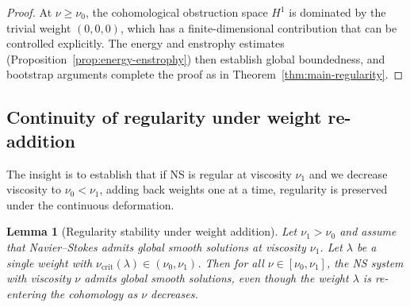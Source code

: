\documentclass[reqno,10pt]{amsart}
\theoremstyle{plain}
\newtheorem{lemma}[theorem]{Lemma}
\theoremstyle{definition}
\begin{document}
\begin{proof}
At $\nu \geq \nu_0$, the cohomological obstruction space $H^1$ is dominated by the trivial weight $(0,0,0)$, which has a finite-dimensional contribution that can be controlled explicitly. The energy and enstrophy estimates (Proposition~\ref{prop:energy-enstrophy}) then establish global boundedness, and bootstrap arguments complete the proof as in Theorem~\ref{thm:main-regularity}.
\end{proof}

\subsection{Continuity of regularity under weight re-addition}

The insight is to establish that if NS is regular at viscosity $\nu_1$ and we decrease viscosity to $\nu_0 < \nu_1$, adding back weights one at a time, regularity is preserved under the continuous deformation.

\begin{lemma}[Regularity stability under weight addition]\label{lem:weight-stability}
Let $\nu_1 > \nu_0$ and assume that Navier--Stokes admits global smooth solutions at viscosity $\nu_1$. Let $\lambda$ be a single weight with $\nu_{\text{crit}}(\lambda) \in (\nu_0, \nu_1)$. Then for all $\nu \in [\nu_0, \nu_1]$, the NS system with viscosity $\nu$ admits global smooth solutions, even though the weight $\lambda$ is re-entering the cohomology as $\nu$ decreases.
\end{lemma}
\end{document}
